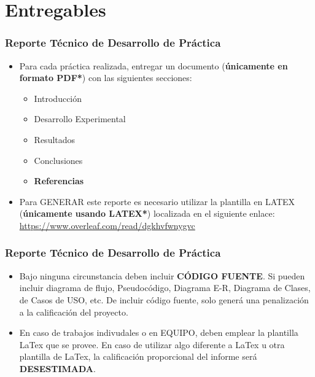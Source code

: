 

\section{Entregables}



\begin{frame}
\frametitle{Reporte Técnico de Desarrollo de Práctica}
\begin{itemize}
\item Para cada práctica realizada, entregar un documento (\textbf{únicamente en formato PDF*}) con las siguientes secciones:
\begin{itemize}
\item Introducción
\item Desarrollo Experimental
\item Resultados
\item Conclusiones
\item \textbf{Referencias}
\end{itemize}
\item Para GENERAR este reporte es necesario utilizar la plantilla en LATEX (\textbf{únicamente usando LATEX*}) localizada en el siguiente enlace:
\url{https://www.overleaf.com/read/dgkhvfwnygvc}
\end{itemize}
\end{frame}

\begin{frame}
\frametitle{Reporte Técnico de Desarrollo de Práctica}
\begin{itemize}
\item Bajo ninguna circunstancia deben incluir \textbf{CÓDIGO FUENTE}. Si pueden incluir diagrama de flujo, Pseudocódigo, Diagrama E-R, Diagrama de Clases, de Casos de USO, etc. De incluir código fuente, solo generá una penalizaci\'on a la calificación del proyecto.  
\item En caso de trabajos indivudales o en EQUIPO, deben emplear la plantilla LaTex que se provee. En caso de utilizar algo diferente a LaTex u otra plantilla de LaTex, la calificación proporcional del informe será \textbf{DESESTIMADA}. 
\end{itemize}

\end{frame}


